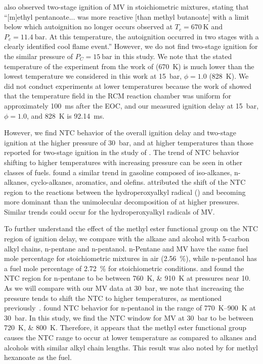 \documentclass[letterpaper, review, sort&compress]{elsarticle}
\begin{document}
\citet{Hadj-Ali2009} also observed two-stage ignition of MV in stoichiometric mixtures, stating that
``[m]ethyl pentanoate... was more reactive [than methyl butanoate] with a limit below which
autoignition no longer occurs observed at \(T_c = \SI{670}{\K}\) and \(P_c = \SI{11.4}{\bar}\). At
this temperature, the autoignition occurred in two stages with a clearly identified cool flame
event.'' However, we do not find two-stage ignition for the similar pressure of
\(P_C = \SI{15}{\bar}\) in this study. We note that the stated temperature of the experiment from
the work of \citet{Hadj-Ali2009} (\SI{670}{\K}) is much lower than the lowest temperature we
considered in this work at \SI{15}{\bar}, \(\phi=1.0\) (\SI{828}{\K}). We did not conduct
experiments at lower temperatures because the work of \citet{Mittal2006} showed that the temperature
field in the RCM reaction chamber was uniform for approximately \SI{100}{\ms} after the EOC, and our
measured ignition delay at \SI{15}{\bar}, \(\phi=1.0\), and \SI{828}{\K} is \SI{92.14}{\ms}.

However, we find NTC behavior of the overall ignition delay and two-stage ignition at the higher
pressure of \SI{30}{\bar}, and at higher temperatures than those reported for two-stage ignition in
the study of \citet{Hadj-Ali2009}. The trend of NTC behavior shifting to higher temperatures with
increasing pressure can be seen in other classes of fuels. \citet{Kukkadapu2012} found a similar
trend in gasoline composed of iso-alkanes, n-alkanes, cyclo-alkanes, aromatics, and olefins.
\citet{Kukkadapu2012} attributed the shift of the NTC region to the reactions between the
hydroperoxyalkyl radical () and  becoming more dominant than the unimolecular
decomposition of  at higher pressures. Similar trends could occur for the hydroperoxyalkyl
radicals of MV.

To further understand the effect of the methyl ester functional group on the NTC region of ignition
delay, we compare with the alkane and alcohol with 5-carbon alkyl chains, n-pentane and n-pentanol.
n-Pentane and MV have the same fuel mole percentage for stoichiometric mixtures in air
(\SI{2.56}{\percent}), while n-pentanol has a fuel mole percentage of \SI{2.72}{\percent} for
stoichiometric conditions. \citet{Ribaucour1998} and \citet{Bugler2015} found the NTC region for
n-pentane to be between \SIlist{760;910}{\K} at pressures near \SI{10}{\atm}. As we will compare
with our MV data at \SI{30}{\bar}, we note that increasing the pressure tends to shift the NTC to
higher temperatures, as mentioned previously~\cite{Kukkadapu2012}. \citet{Heufer2013} found NTC
behavior for n-pentanol in the range of \SIrange{770}{900}{\K} at \SI{30}{\bar}. In this study, we
find the NTC window for MV at \SI{30}{\bar} to be between \SIlist{720;800}{\K}. Therefore, it
appears that the methyl ester functional group causes the NTC range to occur at lower temperature as
compared to alkanes and alcohols with similar alkyl chain lengths. This result was also noted by
\citet{Hadj-Ali2009} for methyl hexanoate as the fuel.
\end{document}

